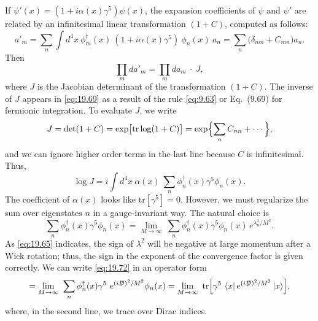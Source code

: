 If $\psi'(x) = (1+i\alpha(x)\gamma^5)\psi(x)$, the expansion coefficients of
$\psi$ and $\psi'$ are related by an infinitesimal linear transformation
$(1+C)$, computed as follows:
\begin{equation}
  a'_m = \sum_n \int d^4x\ \phi^{\dagger}_m(x)\ (1+i\alpha(x)\gamma^5)\
    \phi_n(x)\ a_n = \sum_n \bigl( \delta_{mn} + C_{mn} \bigr)a_n .
  \label{eq:19.68}
\end{equation}
Then
\begin{equation}
  \prod_m da'_m = \prod_m da_m\ \cdot\ J ,
  \label{eq:19.69}
\end{equation}
where $J$ is the Jacobian determinant of the transformation $(1+C)$.  The
inverse of $J$ appears in \eqref{eq:19.69} as a result of the rule
\eqref{eq:9.63} or Eq.~(9.69) for fermionic integration.  To evaluate
$J$, we write
\begin{equation}
  J = \det(1+C) = \exp\bigl[ \mathrm{tr}\log(1+C) \bigr]
  = \exp\Bigl\{ \sum_n C_{nn} + \cdots \Bigr\} ,
  \label{eq:19.70}
\end{equation}
and we can ignore higher order terms in the last line because $C$ is
infinitesimal.  Thus,
\begin{equation}
  \log J = i\int d^4x\ \alpha(x)\ \sum_n \phi^{\dagger}_n(x)\gamma^5\phi_n(x)
  .
  \label{eq:19.71}
\end{equation}
The coefficient of $\alpha(x)$ looks like $\mathrm{tr}[\gamma^5] = 0$.
However, we must regularize the sum over eigenstates $n$ in a gauge-invariant
way.  The natural choice is
\begin{equation}
  \sum_n \phi^{\dagger}_n(x)\gamma^5\phi_n(x)
  = \lim_{M\to\infty}\ \sum_n \phi^{\dagger}_n(x)\gamma^5\phi_n(x)\,
    e^{\lambda_n^2/M^2} .
  \label{eq:19.72}
\end{equation}
As \eqref{eq:19.65} indicates, the sign of $\lambda^2$ will be negative at
large momentum after a Wick rotation; thus, the sign in the exponent of the
convergence factor is given correctly.  We can write \eqref{eq:19.72} in an
operator form
\begin{equation}
  = \lim_{M\to\infty}\ \sum_n \phi^{\dagger}_n(x)\gamma^5\
    e^{(i\slashed{D})^2/M^2}\phi_n(x)
  = \lim_{M\to\infty}\ \mathrm{tr}\Bigl[ \gamma^5\ \langle x|\,
    e^{(i\slashed{D})^2/M^2}\,|x\rangle \Bigr] ,
  \label{eq:19.73}
\end{equation}
where, in the second line, we trace over Dirac indices.

